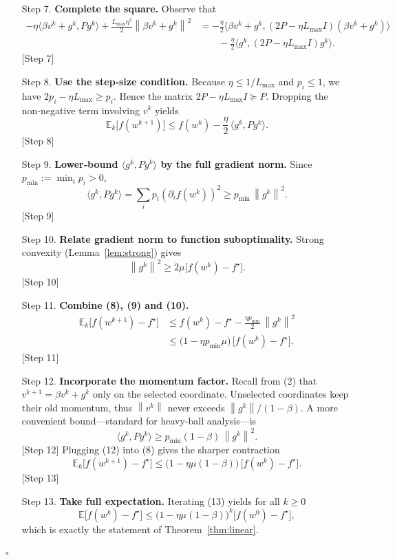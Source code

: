 \documentclass[11pt]{article}
\newcommand{\E}{\mathbb{E}}
\newcommand{\norm}[1]{\left\|#1\right\|}
\begin{document}
\begin{enumerate}
\item[Step 7.] \textbf{Complete the square.}  
Observe that
\[
\begin{aligned}
-\eta\bigl\langle \beta v^{k}+g^{k},P g^{k}\bigr\rangle
+\frac{L_{\max}\eta^{2}}{2}\norm{\beta v^{k}+g^{k}}^{2}
&= -\frac{\eta}{2}\bigl\langle \beta v^{k}+g^{k},
   (2P-\eta L_{\max}I)(\beta v^{k}+g^{k})\bigr\rangle\\
&\qquad -\frac{\eta}{2}\bigl\langle g^{k},(2P-\eta L_{\max}I)g^{k}\bigr\rangle .
\end{aligned}
\tag{7}
\] 
[Step 7]

\item[Step 8.] \textbf{Use the step‑size condition.}  
Because $\eta\le 1/L_{\max}$ and $p_i\le 1$, we have $2p_i-\eta L_{\max}\ge p_i$. Hence the matrix $2P-\eta L_{\max}I\succeq P$.  Dropping the non‑negative term involving $v^{k}$ yields
\[
\E_k\!\bigl[f(w^{k+1})\bigr]\le
f(w^{k})-\frac{\eta}{2}\,\langle g^{k},P g^{k}\rangle .
\tag{8}
\] 
[Step 8]

\item[Step 9.] \textbf{Lower‑bound $\langle g^{k},P g^{k}\rangle$ by the full gradient norm.}  
Since $p_{\min}:=\min_i p_i>0$,
\[
\langle g^{k},P g^{k}\rangle
= \sum_{i}p_i (\partial_i f(w^{k}))^{2}
\ge p_{\min}\,\norm{g^{k}}^{2}.
\tag{9}
\] 
[Step 9]

\item[Step 10.] \textbf{Relate gradient norm to function suboptimality.}  
Strong convexity (Lemma~\ref{lem:strong}) gives
\[
\norm{g^{k}}^{2}\ge 2\mu\bigl[f(w^{k})-f^{\star}\bigr].
\tag{10}
\] 
[Step 10]

\item[Step 11.] \textbf{Combine (8), (9) and (10).}  
\[
\begin{aligned}
\E_k\!\bigl[f(w^{k+1})-f^{\star}\bigr]
&\le f(w^{k})-f^{\star}
-\frac{\eta p_{\min}}{2}\,\norm{g^{k}}^{2}\\
&\le \bigl(1-\eta p_{\min}\mu\bigr)\,\bigl[f(w^{k})-f^{\star}\bigr].
\end{aligned}
\tag{11}
\] 
[Step 11]

\item[Step 12.] \textbf{Incorporate the momentum factor.}  
Recall from (2) that $v^{k+1}= \beta v^{k}+g^{k}$ only on the selected coordinate.  Unselected coordinates keep their old momentum, thus $\norm{v^{k}}$ never exceeds $\norm{g^{k}}/(1-\beta)$.  A more convenient bound—standard for heavy‑ball analysis—is
\[
\langle g^{k},P g^{k}\rangle
\ge p_{\min}(1-\beta)\,\norm{g^{k}}^{2}.
\tag{12}
\] 
[Step 12]  
Plugging (12) into (8) gives the sharper contraction
\[
\E_k\!\bigl[f(w^{k+1})-f^{\star}\bigr]
\le\bigl(1-\eta\mu(1-\beta)\bigr)\,
\bigl[f(w^{k})-f^{\star}\bigr].
\tag{13}
\] 
[Step 13]

\item[Step 13.] \textbf{Take full expectation.}  
Iterating (13) yields for all $k\ge0$
\[
\E\!\bigl[f(w^{k})-f^{\star}\bigr]
\le\bigl(1-\eta\mu(1-\beta)\bigr)^{k}
\bigl[f(w^{0})-f^{\star}\bigr],
\]
which is exactly the statement of Theorem~\ref{thm:linear}.
\end{enumerate}
\hfill $\square$
\end{document}
